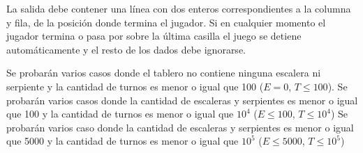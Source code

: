 \documentclass{oci}
\begin{document}
\begin{outputDescription}
  La salida debe contener una línea con dos enteros correspondientes a la
  columna y fila, de la posición donde termina el jugador.
  Si en cualquier momento el jugador termina o pasa por sobre la última casilla
  el juego se detiene automáticamente y el resto de los dados debe ignorarse.
\end{outputDescription}

\begin{scoreDescription}
   Se probarán varios casos donde el tablero no contiene ninguna
  escalera ni serpiente y la cantidad de turnos es menor o igual que 100
  ($E = 0$, $T \leq 100$).
   Se probarán varios casos donde la cantidad de escaleras y
  serpientes es menor o igual que 100 y la cantidad de turnos es menor o igual
  que $10^4$ ($E \leq 100$, $T \leq 10^4$)
   Se probarán varios caso donde la cantidad de escaleras y serpientes
  es menor o igual que 5000 y la cantidad de turnos es menor o igual que $10^5$
  ($E \leq 5000$, $T \leq 10^5$)
\end{scoreDescription}

\begin{sampleDescription}
\end{sampleDescription}
\end{document}
